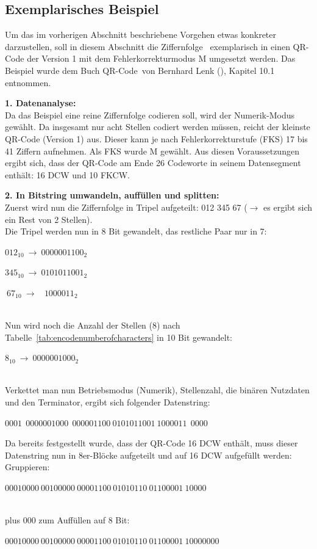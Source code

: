 \subsection{Exemplarisches Beispiel}
Um das im vorherigen Abschnitt beschriebene Vorgehen etwas konkreter darzustellen, soll in diesem Abschnitt die Ziffernfolge \grqq~exemplarisch in einen QR-Code der Version 1 mit dem Fehlerkorrekturmodus M umgesetzt werden. Das Beispiel wurde dem Buch \glqq QR-Code\grqq~von Bernhard Lenk (\cite{Lenk2012}), Kapitel 10.1 entnommen.

\textbf{1. Datenanalyse:}\\
Da das Beispiel eine reine Ziffernfolge codieren soll, wird der Numerik-Modus gewählt. Da insgesamt nur acht Stellen codiert werden müssen, reicht der kleinste QR-Code (Version 1) aus. Dieser kann je nach Fehlerkorrekturstufe (FKS) 17 bis 41 Ziffern aufnehmen. Als FKS wurde M gewählt. Aus diesen Voraussetzungen ergibt sich, dass der QR-Code am Ende 26 Codeworte in seinem Datensegment enthält: 16 DCW und 10 FKCW. 

\textbf{2. In Bitstring umwandeln, auffüllen und splitten:}\\
Zuerst wird nun die Ziffernfolge in Tripel aufgeteilt: 012 345 67 ($\rightarrow$ es ergibt sich ein Rest von 2 Stellen).\\
Die Tripel werden nun in 8 Bit gewandelt, das restliche Paar nur in 7: \\
\centerline{$012_{10}~\rightarrow~0000001100_2$}
\centerline{$345_{10}~\rightarrow~0101011001_2$}
\centerline{$~67_{10}~\rightarrow~~~~1000011_2$}\\
Nun wird noch die Anzahl der Stellen (8) nach Tabelle~\ref{tab:encodenumberofcharacters} in 10 Bit gewandelt:
\centerline{$8_{10}~\rightarrow~0000001000_2$}\\
Verkettet man nun Betriebsmodus (Numerik), Stellenzahl, die binären Nutzdaten und den Terminator, ergibt sich folgender Datenstring:
\centerline{$0001~~0000001000~~000001100~0101011001~1000011~~0000$}

Da bereits festgestellt wurde, dass der QR-Code 16 DCW enthält, muss dieser Datenstring nun in 8er-Blöcke aufgeteilt und auf 16 DCW aufgefüllt werden:\\
Gruppieren:\\
\centerline{$00010000~00100000~00001100~01010110~01100001~10000$}\\
plus 000 zum Auffüllen auf 8 Bit:\\
\centerline{$00010000~00100000~00001100~01010110~01100001~10000000$}\\

